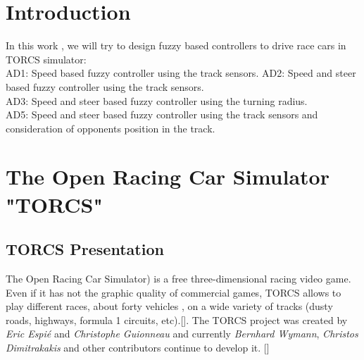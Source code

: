 \documentclass{llncs}
\begin{document}
%
%
%
\vspace{1cm}
%


\begin{abstract}
\end{abstract}
\section{Introduction}

In this work , we will try to design fuzzy based controllers to drive race cars in TORCS simulator:\\
AD1: Speed  based fuzzy controller using the track sensors.
AD2: Speed and steer based fuzzy controller using the track sensors.\\
AD3: Speed and steer based fuzzy controller using the turning radius.\\
AD5: Speed and steer based fuzzy controller using the track sensors and consideration of opponents position in the track.

\section{The Open Racing Car Simulator "TORCS"}
\subsection{TORCS Presentation}

The Open Racing Car Simulator) is a free three-dimensional racing video game.
Even if it has not the graphic quality of commercial games, TORCS allows to play different races, about forty vehicles , on a wide variety of tracks (dusty roads, highways, formula 1 circuits, etc).[\cite{manuel}]. The TORCS project was created by \textit{Eric Espié} and \textit{Christophe Guionneau} and currently \textit{Bernhard Wymann}, \textit{Christos Dimitrakakis}  and other contributors continue to develop it. [\cite{manual}]
\end{document}
